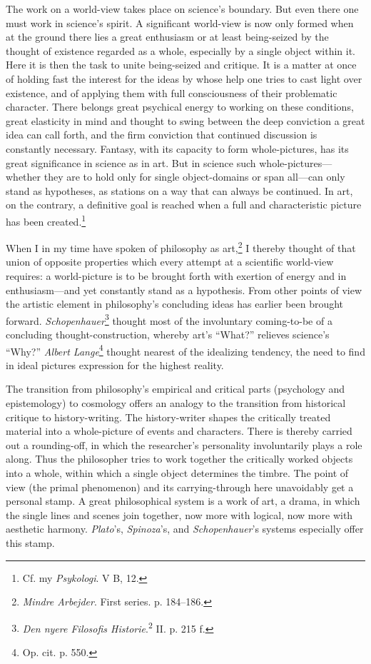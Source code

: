 \documentclass[12pt,a4paper]{book}
\newcommand{\opage}[1]{\marginnote{\footnotesize\textit{[#1]}}}
\begin{document}
The work on a world-view takes place on science's boundary. But even there one must work in
science's spirit. A significant world-view is now only formed when at the ground there lies a great
enthusiasm or at least being-seized by the thought of existence regarded as a whole, especially by
a single object within it. Here it is then the task to unite being-seized and critique. It is a
matter at once of holding fast the interest for the ideas by whose help one tries to cast light
over existence, and of applying them with full consciousness of their problematic character. There
belongs great psychical energy to working on these conditions, great elasticity in mind and thought
to swing between the deep conviction a great idea can call forth, and the firm \opage{314}conviction that
continued discussion is constantly necessary. Fantasy, with its capacity to form whole-pictures, has
its great significance in science as in art. But in science such whole-pictures---whether they are to
hold only for single object-domains or span all---can only stand as hypotheses, as stations on a way
that can always be continued. In art, on the contrary, a definitive goal is reached when a full and
characteristic picture has been created.\footnote{Cf. my \emph{Psykologi}. V B, 12.}

When I in my time have spoken of philosophy as art,\footnote{\emph{Mindre Arbejder}. First series.
p. 184--186.} I thereby thought of that union of opposite properties which every attempt at a
scientific world-view requires: a world-picture is to be brought forth with exertion of energy and
in enthusiasm---and yet constantly stand as a hypothesis. From other points of view the artistic
element in philosophy's concluding ideas has earlier been brought forward. \emph{Schopenhauer}\footnote{\emph{Den
nyere Filosofis Historie}.\textsuperscript{2} II. p. 215 f.} thought most of the involuntary
coming-to-be of a concluding thought-construction, whereby art's ``What?'' relieves science's
``Why?'' \emph{Albert Lange}\footnote{Op. cit. p. 550.} thought nearest of the idealizing tendency,
the need to find in ideal pictures expression for the highest reality.

The transition from philosophy's empirical and critical parts (psychology and epistemology) to
cosmology offers an analogy to the transition from historical critique to history-writing. The history-writer shapes the critically treated material into a whole-picture of events and characters.
There is thereby carried out a rounding-off, in which the researcher's personality involuntarily
plays a role along. Thus the philosopher tries to work together the critically worked objects into a
whole, within which a single object determines the timbre. The point of view (the primal phenomenon)
and its carrying-through here unavoidably get a personal stamp. A great philosophical system is a
work of art, a drama, in which the single lines and scenes join together, now more \opage{315}with logical, now
more with aesthetic harmony. \emph{Plato}'s, \emph{Spinoza}'s, and \emph{Schopenhauer}'s systems
especially offer this stamp.
\end{document}
